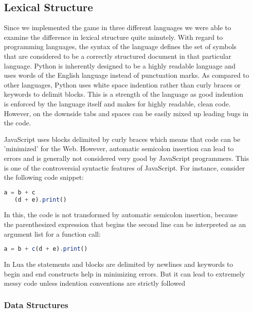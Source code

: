 \subsection{Lexical Structure}
Since we implemented the game in three different languages we were able to examine the difference in lexical structure quite minutely. With regard to programming languages, the syntax of the language defines the set of symbols that are considered to be a correctly structured document in that particular language. Python is inherently designed to be a highly readable language and uses words of the English language instead of punctuation marks. As compared to other languages, Python uses white space indention rather than curly braces or keywords to delimit blocks. This is a strength of the language as good indention is enforced by the language itself and makes for highly readable, clean code. However, on the downside tabs and spaces can be easily mixed up leading bugs in the code. 

JavaScript uses blocks delimited by curly braces which means that code can be 'minimized' for the Web. However, automatic semicolon insertion  can lead to errors and is generally not considered very good by JavaScript programmers. This is one of the controversial syntactic features of JavaScript. For instance, consider the following code snippet:
\begin{lstlisting}[language={JavaScript}, %
  title={}, label=semicolon]
	a = b + c
   (d + e).print()
\end{lstlisting}

In this, the code is not transformed by automatic semicolon insertion, because the parenthesized expression that begins the second line can be interpreted as an argument list for a function call:

\begin{lstlisting}[language={JavaScript}, %
  title={}, label=semicolon]
	a = b + c(d + e).print()
\end{lstlisting}

In Lua the statements and blocks are delimited by newlines and keywords to begin and end constructs help in minimizing errors. But it can lead to extremely messy code unless indention conventions are strictly followed


\subsubsection{Data Structures}

